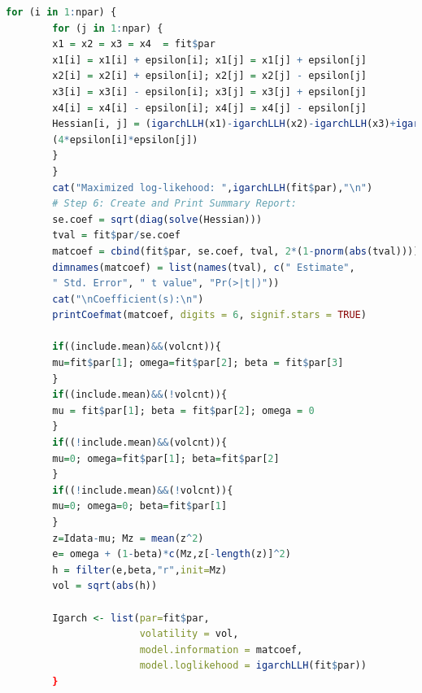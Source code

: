 \begin{lstlisting}[language = R]
        for (i in 1:npar) {
        for (j in 1:npar) {
        x1 = x2 = x3 = x4  = fit$par
        x1[i] = x1[i] + epsilon[i]; x1[j] = x1[j] + epsilon[j]
        x2[i] = x2[i] + epsilon[i]; x2[j] = x2[j] - epsilon[j]
        x3[i] = x3[i] - epsilon[i]; x3[j] = x3[j] + epsilon[j]
        x4[i] = x4[i] - epsilon[i]; x4[j] = x4[j] - epsilon[j]
        Hessian[i, j] = (igarchLLH(x1)-igarchLLH(x2)-igarchLLH(x3)+igarchLLH(x4))/
        (4*epsilon[i]*epsilon[j])
        }
        }
        cat("Maximized log-likehood: ",igarchLLH(fit$par),"\n")
        # Step 6: Create and Print Summary Report:
        se.coef = sqrt(diag(solve(Hessian)))
        tval = fit$par/se.coef
        matcoef = cbind(fit$par, se.coef, tval, 2*(1-pnorm(abs(tval))))
        dimnames(matcoef) = list(names(tval), c(" Estimate",
        " Std. Error", " t value", "Pr(>|t|)"))
        cat("\nCoefficient(s):\n")
        printCoefmat(matcoef, digits = 6, signif.stars = TRUE)

        if((include.mean)&&(volcnt)){
        mu=fit$par[1]; omega=fit$par[2]; beta = fit$par[3]
        }
        if((include.mean)&&(!volcnt)){
        mu = fit$par[1]; beta = fit$par[2]; omega = 0
        }
        if((!include.mean)&&(volcnt)){
        mu=0; omega=fit$par[1]; beta=fit$par[2]
        }
        if((!include.mean)&&(!volcnt)){
        mu=0; omega=0; beta=fit$par[1]
        }
        z=Idata-mu; Mz = mean(z^2)
        e= omega + (1-beta)*c(Mz,z[-length(z)]^2)
        h = filter(e,beta,"r",init=Mz)
        vol = sqrt(abs(h))

        Igarch <- list(par=fit$par,
                       volatility = vol,
                       model.information = matcoef,
                       model.loglikehood = igarchLLH(fit$par))
        }
        \end{lstlisting}


